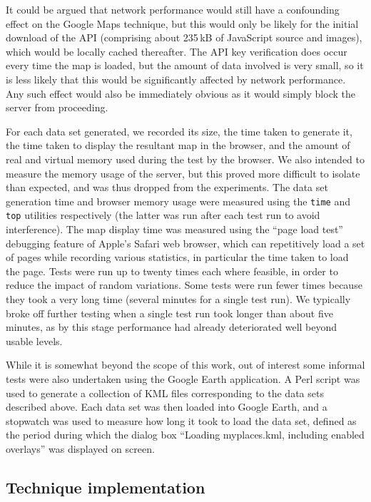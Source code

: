 \documentclass[acmtocl,acmnow]{acmtrans2m}
\begin{document}
It could be argued that network performance would still have a
confounding effect on the Google Maps technique, but this would only be
likely for the initial download of the API (comprising about 235\,kB of
JavaScript source and images), which would be locally cached thereafter.
The API key verification does occur every time the map is loaded, but
the amount of data involved is very small, so it is less likely that
this would be significantly affected by network performance. Any such
effect would also be immediately obvious as it would simply block the
server from proceeding.

For each data set generated, we recorded its size, the time taken to
generate it, the time taken to display the resultant map in the browser,
and the amount of real and virtual memory used during the test by the
browser. We also intended to measure the memory usage of the server, but
this proved more difficult to isolate than expected, and was thus
dropped from the experiments. The data set generation time and browser
memory usage were measured using the \texttt{time} and \texttt{top}
utilities respectively (the latter was run after each test run to avoid
interference). The map display time was measured using the ``page load
test'' debugging feature of Apple's Safari web browser, which can
repetitively load a set of pages while recording various statistics, in
particular the time taken to load the page. Tests were run up to twenty
times each where feasible, in order to reduce the impact of random
variations. Some tests were run fewer times because they took a very
long time (several minutes for a single test run). We typically broke
off further testing when a single test run took longer than about five
minutes, as by this stage performance had already deteriorated well
beyond usable levels.

While it is somewhat beyond the scope of this work, out of interest some
informal tests were also undertaken using the Google Earth application.
A Perl script was used to generate a collection of KML files
corresponding to the data sets described above. Each data set was then
loaded into Google Earth, and a stopwatch was used to measure how long
it took to load the data set, defined as the period during which the
dialog box ``\textsf{Loading myplaces.kml, including enabled overlays}''
was displayed on screen.


\subsection{Technique implementation}
\end{document}
